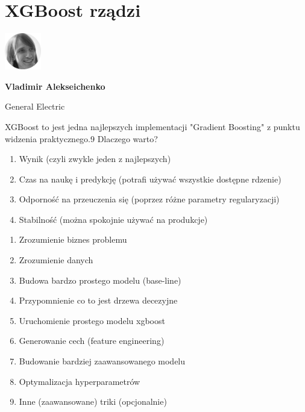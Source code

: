 \documentclass[\main/boa.tex]{subfiles}
\begin{document}
\section{XGBoost rządzi}
\begin{minipage}[t]{0.915\textwidth}
	\center     
    \includegraphics[width=60px]{img/workshops/czarno_biale/vladimir-crop.png} 
\end{minipage}

\begin{minipage}{0.915\textwidth}
\centering
{\bf {} Vladimir Alekseichenko}
\end{minipage}

\vskip 0.3cm

\begin{affiliations}
\begin{minipage}{0.915\textwidth}
\centering
\large General Electric \\[2pt]
\end{minipage}
\end{affiliations}

\vskip 0.8cm

\opiswarsztatu XGBoost to jest jedna najlepszych implementacji "Gradient Boosting" z punktu widzenia praktycznego.9
Dlaczego warto?
\begin{enumerate}
	\item Wynik (czyli zwykle jeden z najlepszych)
	\item Czas na naukę i predykcję (potrafi używać wszystkie dostępne rdzenie)
	\item Odporność na przeuczenia się (poprzez różne parametry regularyzacji)
	\item Stabilność (można spokojnie używać na produkcje)
\end{enumerate}

\planwarsztatu
\begin{enumerate}
\item Zrozumienie biznes problemu
\item Zrozumienie danych
\item Budowa bardzo prostego modelu (base-line)
\item Przypomnienie co to jest drzewa decezyjne
\item Uruchomienie prostego modelu xgboost
\item Generowanie cech (feature engineering)
\item Budowanie bardziej zaawansowanego modelu
\item Optymalizacja hyperparametrów
\item Inne (zaawansowane) triki (opcjonalnie)
\end{enumerate}	 
\end{document}
